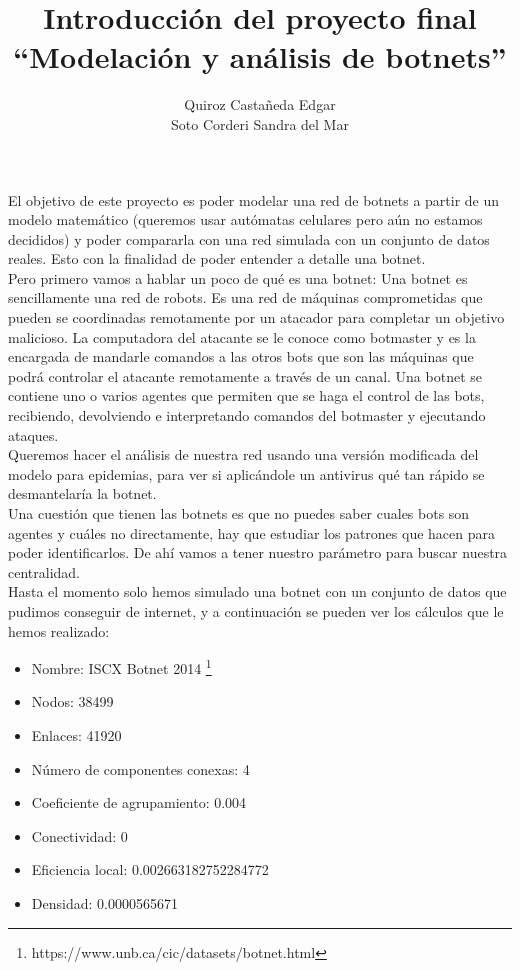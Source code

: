 \documentclass[12pt]{extreport}
\title{
	Introducción del proyecto final\\ 
	``Modelación y análisis de botnets''
	}
\author{
	Quiroz Castañeda Edgar \\
	Soto Corderi Sandra del Mar
	}
\makeatletter
\renewcommand{\maketitle}{
	\bgroup\setlength{\parindent}{0pt}

	\begin{flushright}
		\@author
	\end{flushright}

	\begin{flushleft}
		\textbf{\@title}
	\end{flushleft}

	\egroup
}
\makeatother
\begin{document}
	\maketitle
	
	El objetivo de este proyecto es poder modelar una red de botnets a partir de un modelo matemático (queremos usar autómatas celulares pero aún no estamos decididos) y poder compararla con una red simulada con un conjunto de datos reales. Esto con la finalidad de poder entender a detalle una botnet.\\
	
	Pero primero vamos a hablar  un poco de qué es una botnet:
	Una botnet es sencillamente una red de robots. Es una red de máquinas comprometidas que pueden se coordinadas remotamente por un atacador para completar un objetivo malicioso. La computadora del atacante se le conoce como botmaster y es la encargada de mandarle comandos a las otros bots que son las máquinas que podrá controlar el atacante remotamente a través de un canal. 
	Una botnet se contiene uno o varios agentes que permiten que se haga el control de las bots, recibiendo, devolviendo e interpretando comandos del botmaster y ejecutando ataques.
	\\
	
	Queremos hacer el análisis de nuestra red usando una versión modificada del modelo para epidemias, para ver si aplicándole un antivirus qué tan rápido se desmantelaría la botnet.\\
	
	Una cuestión que tienen las botnets es que no puedes saber cuales bots son agentes y cuáles no directamente, hay que estudiar los patrones que hacen para poder identificarlos. De ahí vamos a tener nuestro parámetro para buscar nuestra centralidad.\\
		
	Hasta el momento solo hemos simulado una botnet con un conjunto de datos que pudimos conseguir de internet, y a continuación se pueden ver los cálculos que le hemos realizado:
	
	\begin{itemize}
		\item Nombre: ISCX Botnet 2014 
		\footnote{https://www.unb.ca/cic/datasets/botnet.html}
		
		\item Nodos: 38499
		
		\item Enlaces: 41920
		
		\item Número de componentes conexas: 4
		
		\item Coeficiente de agrupamiento: 0.004
		
		\item Conectividad: 0
		
		\item Eficiencia local: 0.002663182752284772
		
		\item Densidad: 0.0000565671
	\end{itemize}
	
\end{document}
